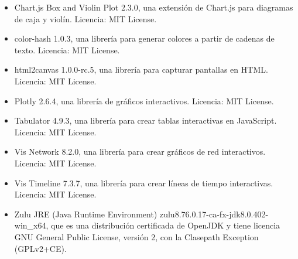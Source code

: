 \begin{itemize}
    \item Chart.js Box and Violin Plot 2.3.0, una extensión de Chart.js para diagramas de caja y violín. Licencia: MIT License.
    \item color-hash 1.0.3, una librería para generar colores a partir de cadenas de texto. Licencia: MIT License.
    \item html2canvas 1.0.0-rc.5, una librería para capturar pantallas en HTML. Licencia: MIT License.
    \item Plotly 2.6.4, una librería de gráficos interactivos. Licencia: MIT License.
    \item Tabulator 4.9.3, una librería para crear tablas interactivas en JavaScript. Licencia: MIT License.
    \item Vis Network 8.2.0, una librería para crear gráficos de red interactivos. Licencia: MIT License.
    \item Vis Timeline 7.3.7, una librería para crear líneas de tiempo interactivas. Licencia: MIT License.
    \item Zulu JRE (Java Runtime Environment) zulu8.76.0.17-ca-fx-jdk8.0.402-win\_x64, que es una distribución certificada de OpenJDK y tiene licencia GNU General Public License, versión 2, con la Clasepath Exception (GPLv2+CE).

\end{itemize}

